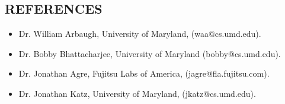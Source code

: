 \begin{resume}
\iffalse
{\bf COMPUTING SKILLS} 
    \begin{itemize}
         \item {\bf Major Skills (5+ years of experience)}
         \begin{itemize}
                \item[] C (7 yrs) and C++ (7 yrs), 
	        \item[] Java (4 yrs),
	        \item[] Shell Programming (5 yrs),
	        \item[] Systems and Network Programming (5 yrs).
         \end{itemize}
         \item {\bf Brief Exposure (project based)}
         \begin{itemize}
                \item[] Visual Basic (1 yr) , Visual C++ (1 yr), HTML(1 yr), COBOL, Access Basic, PL-SQL, Lisp, Prolog.
         \end{itemize}
         \item {\bf Platforms}
         \begin{itemize}
                \item[] UNIX(5yrs), HP-UX(4yrs), Linux(6yrs), Windows (5 yrs) (9x, NT, 2000, XP), IBM-AIX, Solaris(2 yrs).
         \end{itemize}

    \end{itemize}
\fi
 
\section{REFERENCES}
   \begin{itemize}
        \item[] Dr. William Arbaugh, University of Maryland, (waa@cs.umd.edu).
	\item [] Dr. Bobby Bhattacharjee, University of Maryland (bobby@cs.umd.edu).
	\item [] Dr. Jonathan Agre, Fujitsu Labs of America, (jagre@fla.fujitsu.com).
	\item[] Dr. Jonathan Katz, University of Maryland, (jkatz@cs.umd.edu).
   \end{itemize}
\end{resume}































